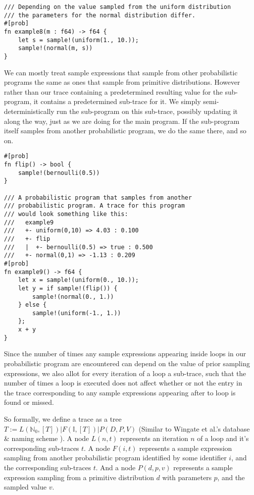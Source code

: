 \begin{minipage}{\linewidth}
\begin{lstlisting}
/// Depending on the value sampled from the uniform distribution
/// the parameters for the normal distribution differ.
#[prob]
fn example8(m : f64) -> f64 {
    let s = sample!(uniform(1., 10.));
    sample!(normal(m, s))
}
\end{lstlisting}
\end{minipage}

We can mostly treat sample expressions that sample from other probabilistic programs the same as ones that sample from primitive distributions. However rather than our trace containing a predetermined resulting value for the sub-program, it contains a predetermined sub-trace for it. We simply semi-deterministically run the sub-program on this sub-trace, possibly updating it along the way, just as we are doing for the main program. If the sub-program itself samples from another probabilistic program, we do the same there, and so on.

\begin{minipage}{\linewidth}
\begin{lstlisting}
#[prob]
fn flip() -> bool {
    sample!(bernoulli(0.5))
}

/// A probabilistic program that samples from another
/// probabilistic program. A trace for this program
/// would look something like this:
///   example9
///   +- uniform(0,10) => 4.03 : 0.100
///   +- flip
///   |  +- bernoulli(0.5) => true : 0.500
///   +- normal(0,1) => -1.13 : 0.209
#[prob]
fn example9() -> f64 {
    let x = sample!(uniform(0., 10.));
    let y = if sample!(flip()) {
        sample!(normal(0., 1.))
    } else {
        sample!(uniform(-1., 1.))
    };
    x + y
}
\end{lstlisting}
\end{minipage}

Since the number of times any sample expressions appearing inside loops in our probabilistic program are encountered can depend on the value of prior sampling expressions, we also allot for every iteration of a loop a sub-trace, such that the number of times a loop is executed does not affect whether or not the entry in the trace corresponding to any sample expressions appearing after to loop is found or missed.

So formally, we define a trace as a tree $T := L(\mathbb{N}_0, [T]) | F(\mathbb{I}, [T]) | P(D,P,V)$ (Similar to Wingate et al.'s database \& naming scheme \cite{wingate2011lightweight}). A node $L(n,t)$ represents an iteration $n$ of a loop and it's corresponding sub-traces $t$. A node $F(i, t)$ represents a sample expression sampling from another probabilistic program identified by some identifier $i$, and the corresponding sub-traces $t$. And a node $P(d,p,v)$ represents a sample expression sampling from a primitive distribution $d$ with parameters $p$, and the sampled value $v$.

